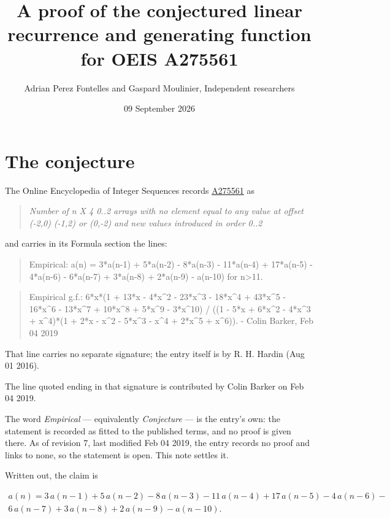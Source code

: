 \documentclass[11pt]{article}
\title{A proof of the conjectured linear recurrence and generating function for OEIS A275561}
\author{Adrian Perez Fontelles and Gaspard Moulinier, Independent researchers}
\date{09 September 2026}
\theoremstyle{definition}
\begin{document}
\maketitle
\section{The conjecture}

The Online Encyclopedia of Integer Sequences records \href{https://oeis.org/A275561}{A275561} as

\begin{quote}\itshape Number of n X 4 0..2 arrays with no element equal to any value at offset (-2,0) (-1,2) or (0,-2) and new values introduced in order 0..2\end{quote}

and carries in its Formula section the lines:

\begin{quote}\ttfamily Empirical: a(n) = 3*a(n-1) + 5*a(n-2) - 8*a(n-3) - 11*a(n-4) + 17*a(n-5) - 4*a(n-6) - 6*a(n-7) + 3*a(n-8) + 2*a(n-9) - a(n-10) for n>11.\end{quote}

\begin{quote}\ttfamily Empirical g.f.: 6*x*(1 + 13*x - 4*x\textasciicircum{}2 - 23*x\textasciicircum{}3 - 18*x\textasciicircum{}4 + 43*x\textasciicircum{}5 - 16*x\textasciicircum{}6 - 13*x\textasciicircum{}7 + 10*x\textasciicircum{}8 + 5*x\textasciicircum{}9 - 3*x\textasciicircum{}10) / ((1 - 5*x + 6*x\textasciicircum{}2 - 4*x\textasciicircum{}3 + x\textasciicircum{}4)*(1 + 2*x - x\textasciicircum{}2 - 5*x\textasciicircum{}3 - x\textasciicircum{}4 + 2*x\textasciicircum{}5 + x\textasciicircum{}6)). - Colin Barker, Feb 04 2019\end{quote}

That line carries no separate signature; the entry itself is by R. H. Hardin (Aug 01 2016).

The line quoted ending in that signature is contributed by Colin Barker on Feb 04 2019.

The word {\itshape Empirical} --- equivalently {\itshape Conjecture} --- is the entry's own: the statement is recorded as fitted to the published terms, and no proof is given there. As of revision 7, last modified Feb 04 2019, the entry records no proof and links to none, so the statement is open. This note settles it.

Written out, the claim is

\begin{multline*} a(n) = 3\,a(n-1) + 5\,a(n-2) - 8\,a(n-3) - 11\,a(n-4) + 17\,a(n-5) - 4\,a(n-6) - \\ 6\,a(n-7) + 3\,a(n-8) + 2\,a(n-9) - a(n-10). \end{multline*}
\end{document}
